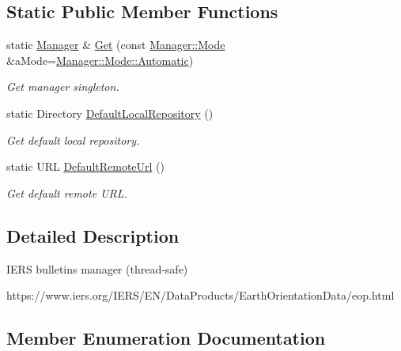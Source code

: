 \subsection*{Static Public Member Functions}
\begin{DoxyCompactItemize}
\item 
static \hyperlink{classlibrary_1_1physics_1_1coord_1_1frame_1_1provider_1_1iers_1_1_manager}{Manager} \& \hyperlink{classlibrary_1_1physics_1_1coord_1_1frame_1_1provider_1_1iers_1_1_manager_a3fc3d26a680efef3636607805d924d27}{Get} (const \hyperlink{classlibrary_1_1physics_1_1coord_1_1frame_1_1provider_1_1iers_1_1_manager_a84f44554ac04c5e18ed7ff448debf392}{Manager\+::\+Mode} \&a\+Mode=\hyperlink{classlibrary_1_1physics_1_1coord_1_1frame_1_1provider_1_1iers_1_1_manager_a84f44554ac04c5e18ed7ff448debf392a086247a9b57fde6eefee2a0c4752242d}{Manager\+::\+Mode\+::\+Automatic})
\begin{DoxyCompactList}\small\item\em Get manager singleton. \end{DoxyCompactList}\item 
static Directory \hyperlink{classlibrary_1_1physics_1_1coord_1_1frame_1_1provider_1_1iers_1_1_manager_a0d62a5b30c69f723146fc366dff865dd}{Default\+Local\+Repository} ()
\begin{DoxyCompactList}\small\item\em Get default local repository. \end{DoxyCompactList}\item 
static U\+RL \hyperlink{classlibrary_1_1physics_1_1coord_1_1frame_1_1provider_1_1iers_1_1_manager_a9af03c7810e280309b30e61f051c2004}{Default\+Remote\+Url} ()
\begin{DoxyCompactList}\small\item\em Get default remote U\+RL. \end{DoxyCompactList}\end{DoxyCompactItemize}


\subsection{Detailed Description}
I\+E\+RS bulletins manager (thread-\/safe) 

https\+://www.iers.\+org/\+I\+E\+R\+S/\+E\+N/\+Data\+Products/\+Earth\+Orientation\+Data/eop.html 

\subsection{Member Enumeration Documentation}
\mbox{\label{classlibrary_1_1physics_1_1coord_1_1frame_1_1provider_1_1iers_1_1_manager_a84f44554ac04c5e18ed7ff448debf392}} 
